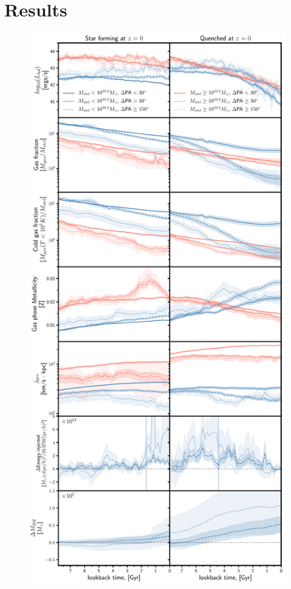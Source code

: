 \documentclass[fleqn,usenatbib]{mnras}
\begin{document}
\section{Results} \label{sec:results}
\begin{figure}
	\includegraphics[width=\linewidth]{overall_population/time_evolution_combo_all.pdf}

\end{figure}
\end{document}
